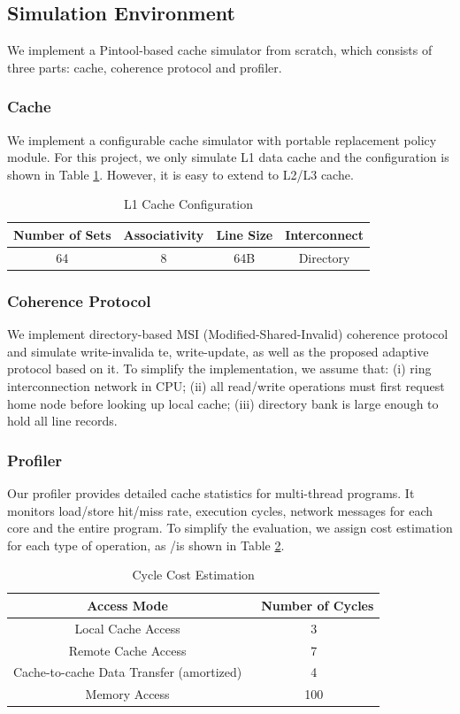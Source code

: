 \documentclass[conference]{IEEEtran}
\begin{document}
\subsection{Simulation Environment}
We implement a Pintool-based cache simulator from scratch, which consists of three parts: cache, coherence protocol and profiler.
\subsubsection{Cache}
We implement a configurable cache simulator with portable replacement policy module. For this project, we only simulate L1 data cache and the configuration is shown in Table \ref{l1_cache_config}. However, it is easy to extend to L2/L3 cache.

\begin{table}[!h]
\renewcommand{\arraystretch}{2.5}
\caption{L1 Cache Configuration}
\label{l1_cache_config}
\centering
\begin{tabular}{|c|c|c|c|}
\hline
Number of Sets & Associativity & Line Size & Interconnect \\
\hline
64 & 8 & 64B & Directory \\
\hline
\end{tabular}
\end{table}
\FloatBarrier

\subsubsection{Coherence Protocol}
We implement directory-based MSI (Modified-Shared-Invalid) coherence protocol and simulate write-invalida
te, write-update, as well as the proposed adaptive protocol based on it. To simplify the implementation, we assume that: (i) ring interconnection network in CPU; (ii) all read/write operations must first request home node before looking up local cache; (iii) directory bank is large enough to hold all line records.

\subsubsection{Profiler}
Our profiler provides detailed cache statistics for multi-thread programs. It monitors load/store hit/miss rate, execution cycles, network messages for each core and the entire program. To simplify the evaluation, we assign cost estimation for each type of operation, as
/is shown in Table \ref{cost_estimation}.

\begin{table}[!h]
\renewcommand{\arraystretch}{2.5}
\caption{Cycle Cost Estimation}
\label{cost_estimation}
\centering
\begin{tabular}{|c|c|}
\hline
Access Mode & \ Number of Cycles\\
\hline
Local Cache Access & 3\\
\hline
Remote Cache Access & 7\\
\hline
Cache-to-cache Data Transfer (amortized) & 4\\
\hline
Memory Access & 100\\
\hline
\end{tabular}
\end{table}
\FloatBarrier
\end{document}
